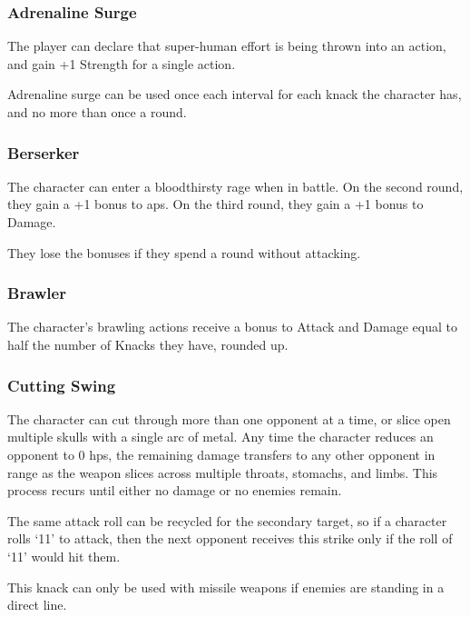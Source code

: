 \begin{multicols}{2}

\subsubsection{Adrenaline Surge}
\label{adrenalinesurge}

The player can declare that super-human effort is being thrown into an action, and gain +1 Strength for a single action.

Adrenaline surge can be used once each interval for each knack the character has, and no more than once a \gls{round}.

\subsubsection{Berserker}

The character can enter a bloodthirsty rage when in battle.
On the second round, they gain a +1 bonus to \glspl{ap}.
On the third round, they gain a +1 bonus to Damage.

They lose the bonuses if they spend a round without attacking.

\subsubsection{Brawler}

The character's brawling actions receive a bonus to Attack and Damage equal to half the number of Knacks they have, rounded up.

\subsubsection{Cutting Swing}

The character can cut through more than one opponent at a time, or slice open multiple skulls with a single arc of metal.
Any time the character reduces an opponent to 0 \glspl{hp}, the remaining damage transfers to any other opponent in range as the weapon slices across multiple throats, stomachs, and limbs.
This process recurs until either no damage or no enemies remain.

The same attack roll can be recycled for the secondary target, so if a character rolls `11' to attack, then the next opponent receives this strike only if the roll of `11' would hit them.

This knack can only be used with missile weapons if enemies are standing in a direct line.


\end{multicols}
